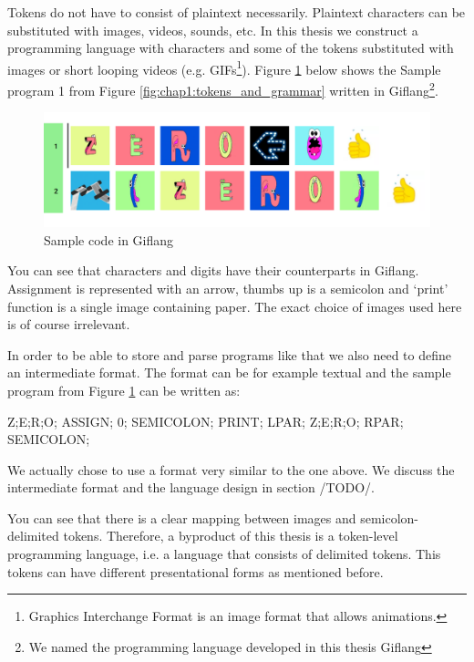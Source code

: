 Tokens do not have to consist of plaintext necessarily. Plaintext characters can be substituted with
images, videos, sounds, etc. In this thesis we construct a programming language with characters and some
of the tokens substituted with images or short looping videos (e.g. GIFs\footnote{Graphics Interchange Format is an image format that allows animations.}).
Figure \ref{fig:chap1:giflang_code} below shows the Sample program 1 from Figure \ref{fig:chap1:tokens_and_grammar} written in Giflang\footnote{We named the
programming language developed in this thesis Giflang}.
\begin{figure}[!hbt]
	\includegraphics[width=\textwidth]{../img/giflang_code}
	\caption{Sample code in Giflang}
	\label{fig:chap1:giflang_code}
\end{figure}

You can see that characters and digits have their counterparts in Giflang. Assignment is represented with an arrow,
thumbs up is a semicolon and `print' function is a single image containing paper. The exact choice of images used here is of course
irrelevant.

In order to be able to store and parse programs like that we also need to define an intermediate
format. The format can be for example textual and the sample program from Figure \ref{fig:chap1:giflang_code} can be written as:
\begin{code}
Z;E;R;O; ASSIGN; 0; SEMICOLON;
PRINT; LPAR; Z;E;R;O; RPAR; SEMICOLON;
\end{code}

We actually chose to use a format very similar to the one above. We discuss the intermediate format and the language design
in section /TODO/.

You can see that there is a clear mapping between images and semicolon-delimited tokens. Therefore, a byproduct of
this thesis is a token-level programming language, i.e. a language that consists of delimited tokens. This tokens
can have different presentational forms as mentioned before.


